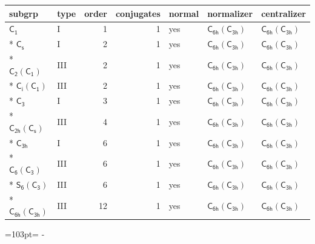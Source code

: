\documentclass[10pt,a4paper]{article}
\newcommand{\needspace}[1]{\par\penalty-100\begingroup\dimen0=#1\relax\dimen2=\pagegoal
  \advance\dimen2-\pagetotal\ifdim\dimen0>\dimen2\relax\ifdim\dimen2>0pt\vfil\break\fi\fi
  \endgroup}
\numberwithin{equation}{section}
\newcommand{\grp}[1]{\mathsf{#1}}
\begin{document}
{\small\begin{longtable}{@{}llrrlll@{}}\toprule
subgrp & type & order & conjugates & normal & normalizer & centralizer\\\midrule\endhead
\bottomrule\endfoot\endlastfoot
\href{../../../rotation/data/pdf/C1.pdf}{$\grp{C_{1}}$} & I & 1 & 1 & yes & \href{C6h-C3h.pdf}{$\grp{C_{6h}}(\grp{C_{3h}})$} & \href{C6h-C3h.pdf}{$\grp{C_{6h}}(\grp{C_{3h}})$}\\*
\href{../../../rotation/data/pdf/C1v.pdf}{$\grp{C_{s}}$} & I & 2 & 1 & yes & \href{C6h-C3h.pdf}{$\grp{C_{6h}}(\grp{C_{3h}})$} & \href{C6h-C3h.pdf}{$\grp{C_{6h}}(\grp{C_{3h}})$}\\*
\href{C2-C1.pdf}{$\grp{C_{2}}(\grp{C_{1}})$} & III & 2 & 1 & yes & \href{C6h-C3h.pdf}{$\grp{C_{6h}}(\grp{C_{3h}})$} & \href{C6h-C3h.pdf}{$\grp{C_{6h}}(\grp{C_{3h}})$}\\*
\href{S2-C1.pdf}{$\grp{C_{i}}(\grp{C_{1}})$} & III & 2 & 1 & yes & \href{C6h-C3h.pdf}{$\grp{C_{6h}}(\grp{C_{3h}})$} & \href{C6h-C3h.pdf}{$\grp{C_{6h}}(\grp{C_{3h}})$}\\*
\href{../../../rotation/data/pdf/C3.pdf}{$\grp{C_{3}}$} & I & 3 & 1 & yes & \href{C6h-C3h.pdf}{$\grp{C_{6h}}(\grp{C_{3h}})$} & \href{C6h-C3h.pdf}{$\grp{C_{6h}}(\grp{C_{3h}})$}\\*
\href{C2h-C1v.pdf}{$\grp{C_{2h}}(\grp{C_{s}})$} & III & 4 & 1 & yes & \href{C6h-C3h.pdf}{$\grp{C_{6h}}(\grp{C_{3h}})$} & \href{C6h-C3h.pdf}{$\grp{C_{6h}}(\grp{C_{3h}})$}\\*
\href{../../../rotation/data/pdf/C3h.pdf}{$\grp{C_{3h}}$} & I & 6 & 1 & yes & \href{C6h-C3h.pdf}{$\grp{C_{6h}}(\grp{C_{3h}})$} & \href{C6h-C3h.pdf}{$\grp{C_{6h}}(\grp{C_{3h}})$}\\*
\href{C6-C3.pdf}{$\grp{C_{6}}(\grp{C_{3}})$} & III & 6 & 1 & yes & \href{C6h-C3h.pdf}{$\grp{C_{6h}}(\grp{C_{3h}})$} & \href{C6h-C3h.pdf}{$\grp{C_{6h}}(\grp{C_{3h}})$}\\*
\href{S6-C3.pdf}{$\grp{S_{6}}(\grp{C_{3}})$} & III & 6 & 1 & yes & \href{C6h-C3h.pdf}{$\grp{C_{6h}}(\grp{C_{3h}})$} & \href{C6h-C3h.pdf}{$\grp{C_{6h}}(\grp{C_{3h}})$}\\*
\href{C6h-C3h.pdf}{$\grp{C_{6h}}(\grp{C_{3h}})$} & III & 12 & 1 & yes & \href{C6h-C3h.pdf}{$\grp{C_{6h}}(\grp{C_{3h}})$} & \href{C6h-C3h.pdf}{$\grp{C_{6h}}(\grp{C_{3h}})$}\\
\bottomrule\end{longtable}}
\needspace{103pt}
\end{document}
